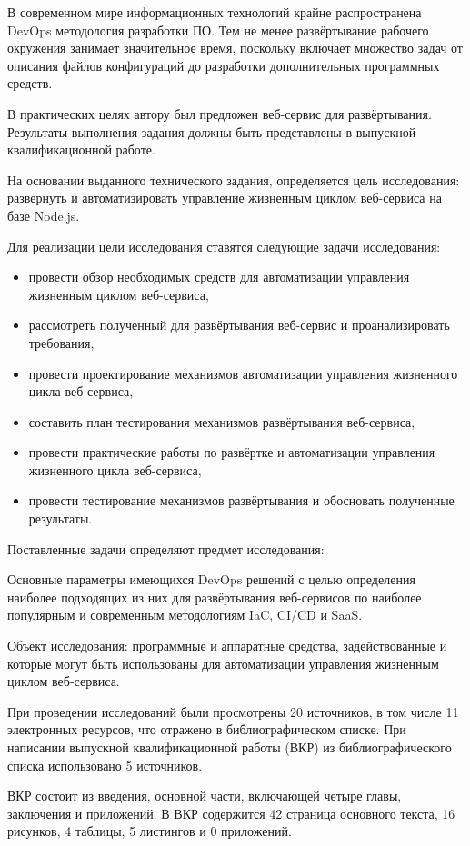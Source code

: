 \Introduction

В современном мире информационных технологий крайне распространена DevOps методология разработки ПО\cite{projectPhoenix}.
Тем не менее развёртывание рабочего окружения занимает значительное время, поскольку включает множество задач от
описания файлов конфигураций до разработки дополнительных программных средств.

В практических целях автору был предложен веб-сервис для развёртывания.
Результаты выполнения задания должны быть представлены в выпускной квалификационной работе.

На основании выданного технического задания, определяется цель исследования: развернуть и автоматизировать управление жизненным циклом веб-сервиса на базе Node.js.

Для реализации цели исследования ставятся следующие задачи исследования:

\begin{itemize}
    \item провести обзор необходимых средств для автоматизации управления жизненным циклом веб-сервиса,
    \item рассмотреть полученный для развёртывания веб-сервис и проанализировать требования,
    \item провести проектирование механизмов автоматизации управления жизненного цикла веб-сервиса,
    \item составить план тестирования механизмов развёртывания веб-сервиса,
    \item провести практические работы по развёртке и автоматизации управления жизненного цикла веб-сервиса,
    \item провести тестирование механизмов развёртывания и обосновать полученные результаты.
\end{itemize}

Поставленные задачи определяют предмет исследования:

Основные параметры имеющихся DevOps решений с целью определения наиболее подходящих из них для развёртывания веб-сервисов
по наиболее популярным и современным методологиям IaC, CI/CD и SaaS.

Объект исследования: программные и аппаратные средства, задействованные и которые могут быть использованы для автоматизации управления жизненным циклом веб-сервиса.

При проведении исследований были просмотрены 20 источников, в том числе 11 электронных ресурсов, что отражено в библиографическом списке.
При написании выпускной квалификационной работы (ВКР) из библиографического списка использовано 5 источников.

ВКР состоит из введения, основной части, включающей четыре главы, заключения и приложений.
В ВКР содержится 42 страница основного текста, 16 рисунков, 4 таблицы, 5 листингов и 0 приложений\cite{vkrsen}.
